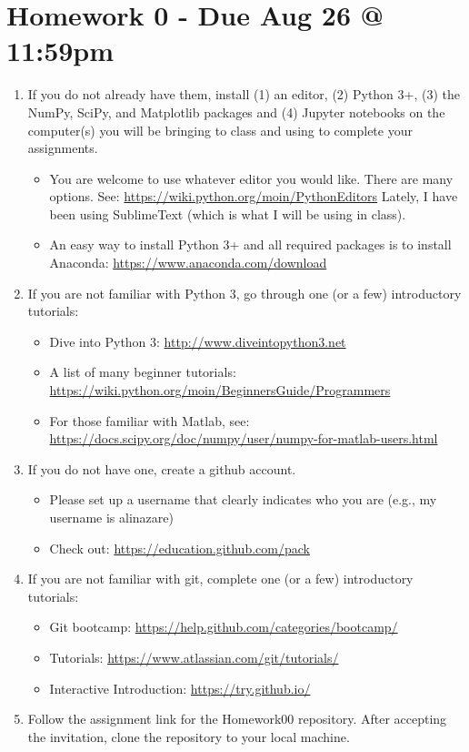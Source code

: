 \documentclass[11pt]{amsart}
\begin{document}
\section{Homework 0 - Due Aug 26 @ 11:59pm}
\begin{enumerate}
\item If you do not already have them, install (1) an editor, (2) Python 3+, (3) the NumPy, SciPy, and Matplotlib packages and (4) Jupyter notebooks on the computer(s) you will be bringing to class and using to complete your assignments.
\begin{itemize}
\item You are welcome to use whatever editor you would like.  There are many options. See: \url{https://wiki.python.org/moin/PythonEditors}  Lately, I have been using SublimeText (which is what I will be using in class).
\item An easy way to install Python 3+ and all required packages is to install Anaconda: \url{https://www.anaconda.com/download} 

\end{itemize}
\item If you are not familiar with Python 3, go through one (or a few) introductory tutorials:
\begin{itemize}
\item Dive into Python 3: \url{http://www.diveintopython3.net}
\item A list of many beginner tutorials: \url{https://wiki.python.org/moin/BeginnersGuide/Programmers}
\item For those familiar with Matlab, see: \url{https://docs.scipy.org/doc/numpy/user/numpy-for-matlab-users.html}
\end{itemize}
\item If you do not have one, create a github account. 
\begin{itemize}
\item Please set up a username that clearly indicates who you are (e.g., my username is alinazare)  
\item Check out: \url{https://education.github.com/pack}
\end{itemize}
\item If you are not familiar with git, complete one (or a few) introductory tutorials:
\begin{itemize}
\item Git bootcamp: \url{https://help.github.com/categories/bootcamp/}
\item Tutorials: \url{https://www.atlassian.com/git/tutorials/}
\item Interactive Introduction: \url{https://try.github.io/}
\end{itemize}
\item Follow the assignment link for the Homework00 repository.  After accepting the invitation, clone the repository to your local machine. 


\end{enumerate}
\end{document}
